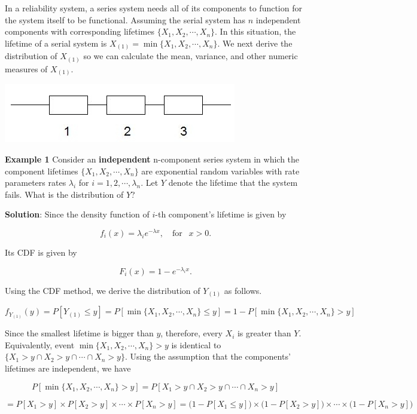\documentclass[
]{book}
\begin{document}
In a reliability system, a series system needs all of its components to function for the system itself to be functional. Assuming the serial system has \(n\) independent components with corresponding lifetimes \(\{ X_1, X_2, \cdots, X_n \}\). In this situation, the lifetime of a serial system is \(X_{(1)} = \min \{X_1, X_2, \cdots, X_n \}\). We next derive the distribution of \(X_{(1)}\) so we can calculate the mean, variance, and other numeric measures of \(X_{(1)}\).

\begin{center}\includegraphics[width=0.5\linewidth]{topic12/seriesSystem} \end{center}

\textbf{\color{red}Example 1} Consider an \textbf{\color{red} independent} n-component series system in which the component lifetimes \(\{ X_1, X_2, \cdots, X_n \}\) are exponential random variables with rate parameters rates \(\lambda_i\) for \(i = 1,2, \cdots, \lambda_n\). Let \(Y\) denote the lifetime that the system fails. What is the distribution of \(Y\)?

\textbf{Solution}: Since the density function of \(i\)-th component's lifetime is given by

\[
f_i(x) = \lambda_i e^{-\lambda x}, \ \ \ \text{ for } \ \ x > 0.
\]

Its CDF is given by

\[
F_i(x) = 1 - e^{-\lambda_i x}.
\]

Using the CDF method, we derive the distribution of \(Y_{(1)}\) as follows.

\[
f_{Y_{(1)}}(y) = P[Y_{(1)} \le y] = P[\min \{X_1, X_2, \cdots, X_n \} \le y] = 1-P[\min \{X_1, X_2, \cdots, X_n \} > y]
\]

Since the smallest lifetime is bigger than \(y\), therefore, every \(X_i\) is greater than \(Y\). Equivalently, event \(\min \{X_1, X_2, \cdots, X_n \} > y\) is identical to \(\{X_1 >y \cap X_2 >y \cap \cdots \cap X_n >y\}\). Using the assumption that the components' lifetimes are independent, we have

\[
P[\min \{X_1, X_2, \cdots, X_n \} > y] = P[X_1 >y \cap X_2 >y \cap \cdots \cap X_n >y] 
\]

\[
= P[X_1 >y] \times P[ X_2 >y] \times  \cdots \times P[ X_n >y] = \big(1-P[X_1 \le y]\big) \times \big( 1-P[ X_2 >y]\big) \times  \cdots \times \big( 1- P[ X_n >y] \big)
\]
\end{document}
